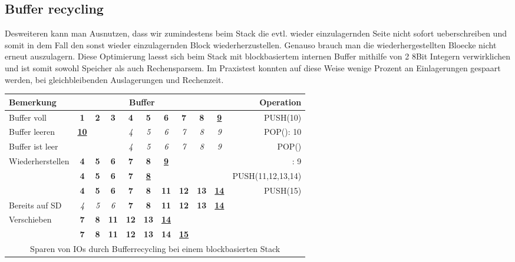 \documentclass[10pt,a4paper]{article}
\begin{document}
\subsection{Buffer recycling}
Desweiteren kann man Ausnutzen, dass wir zumindestens beim Stack die evtl. wieder einzulagernden Seite nicht sofort ueberschreiben und somit in dem Fall den sonst wieder einzulagernden Block wiederherzustellen. Genauso brauch man die wiederhergestellten Bloecke nicht erneut auszulagern. Diese Optimierung laesst sich beim Stack mit blockbasiertem internen Buffer mithilfe von 2 8Bit Integern verwirklichen und ist somit sowohl Speicher als auch Rechensparsem. Im Praxistest konnten auf diese Weise wenige Prozent an Einlagerungen gespaart werden, bei gleichbleibenden Auslagerungen und Rechenzeit.
\begin{center}

	\begin{tabular}{l || c | c | c || c | c | c || c | c | c || r}
	Bemerkung & \multicolumn{8}{c}{Buffer} && Operation\\
	\hline
	\hline
	Buffer voll	& \bf{1}  & \bf{2} & \bf{3} & \bf{4} & \bf{5} & \bf{6} & \bf{7} & \bf{8} & \underline{\bf{9}} & PUSH(10)\\
	\hline
	Buffer leeren &\underline{\bf{10}} & & & \it{4} & \it{5} & \it{6} & \it{7} & \it{8} & \it{9} & POP(): 10\\
	\hline
	Buffer ist leer & &        &        & \it{4} & \it{5} & \it{6} & \it{7} & \it{8} & \it{9} & POP()\\ 
	\hline
	Wiederherstellen & \bf{4} & \bf{5} & \bf{6} & \bf{7} & \bf{8} & \underline{\bf{9}} & & & & : 9 \\
	\hline
	 & \bf{4} & \bf{5} & \bf{6} & \bf{7} & \underline{\bf{8}} &  & & & & PUSH(11,12,13,14)\\
	\hline
	& \bf{4} & \bf{5} & \bf{6} & \bf{7} & \bf{8} & \bf{11} & \bf{12} & \bf{13} & \underline{\bf{14}} & PUSH(15)\\
	\hline
	Bereits auf SD  & \it{4} & \it{5} & \it{6} & \bf{7} & \bf{8} & \bf{11} & \bf{12} & \bf{13} & \underline{\bf{14}}\\
	\hline
	Verschieben & \bf{7} & \bf{8} & \bf{11} & \bf{12} & \bf{13} & \underline{\bf{14}} & & & \\
	\hline
	& \bf{7} & \bf{8} & \bf{11} & \bf{12} & \bf{13} & \bf{14} & \underline{\bf{15}} & & &\\
	\hline
	\hline
	\multicolumn{11}{c}{Sparen von IOs durch Bufferrecycling bei einem blockbasierten Stack}
	\end{tabular}

\end{center}
\end{document}
